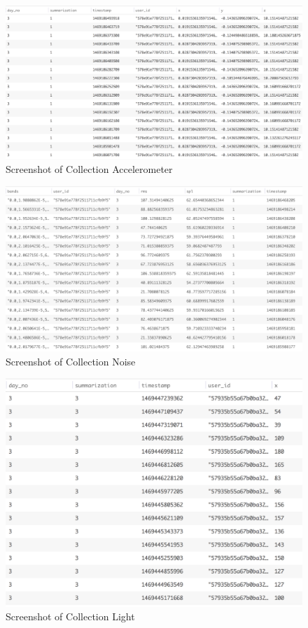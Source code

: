 \begin{figure}[ht!]
\centering
\includegraphics[width=\textwidth,keepaspectratio,height=0.6\textwidth]{./images/collection_acc}
\caption{Screenshot of Collection Accelerometer}
\label{fig:col_acc}
\end{figure}

\begin{figure}[ht!]
\centering
\includegraphics[width=\textwidth,keepaspectratio,height=0.6\textwidth]{./images/collection_noise}
\caption{Screenshot of Collection Noise}
\label{fig:col_noise}
\end{figure}

\begin{figure}[ht!]
\centering
\includegraphics[width=\textwidth,keepaspectratio,height=0.6\textwidth]{./images/collection_light}
\caption{Screenshot of Collection Light}
\label{fig:col_light}
\end{figure}

